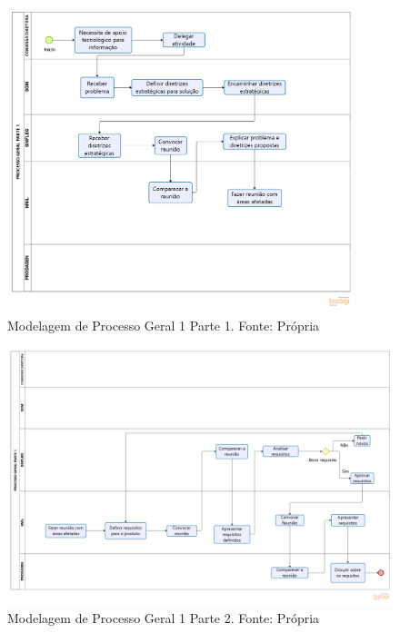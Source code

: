 \begin{figure}[H]
    \centering
    \includegraphics[width=0.9\textwidth]{figuras/modelagemProcessoGeralParte1.png}
    \caption{Modelagem de Processo Geral 1 Parte 1. Fonte: Própria}
    \label{img:modelagemProcessoGeral1Parte1}
\end{figure}

\begin{landscape}
    \begin{figure}[H]
        \centering
        \includegraphics[width=1.3\textwidth]{figuras/modelagemProcessoGeralParte2.png}
        \caption{Modelagem de Processo Geral 1 Parte 2. Fonte: Própria}
        \label{img:modelagemProcessoGeral1Parte2}
    \end{figure}
\end{landscape}

